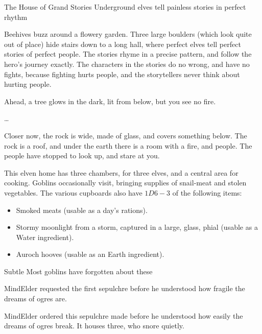 
{The House of Grand Stories}%
{Underground elves tell painless stories in perfect rhythm}%

Beehives buzz around a flowery garden.
Three large boulders (which look quite out of place) hide stairs down to a long hall, where perfect elves tell perfect stories of perfect people.
The stories rhyme in a precise pattern, and follow the hero's journey exactly.
The characters in the stories do no wrong, and have no fights, because fighting hurts people, and the storytellers never think about hurting people.

\begin{boxtext}
  Ahead, a tree glows in the dark, lit from below, but you see no fire.

  \ldots

  Closer now, the rock is  wide, made of glass, and covers something below.
  The rock is a roof, and under the earth there is a room with a fire, and people.
  The people have stopped to look up, and stare at you.
\end{boxtext}

This elven home has three chambers, for three elves, and a central area for cooking.
Goblins occasionally visit, bringing supplies of snail-meat and stolen vegetables.
The various cupboards also have $1D6-3$ of the following items:

\begin{itemize}
  \item
  Smoked meats (usable as a day's \glspl{ration}).
  \item
  Stormy moonlight from a storm, captured in a large, glass, phial (usable as a Water \gls{ingredient}).
  \item
  Auroch hooves (usable as an Earth \gls{ingredient}).
\end{itemize}



%

{Subtle }%
{Most goblins have forgotten about these }%

\begin{exampletext}
  \Gls{MindElder} requested the first \gls{sepulchre} before he understood how fragile the dreams of \glspl{ogre} are.
\end{exampletext}
\Gls{MindElder} ordered this \gls{sepulchre} made before he understood how easily the dreams of \glspl{ogre} break.
It houses three, who snore quietly.

